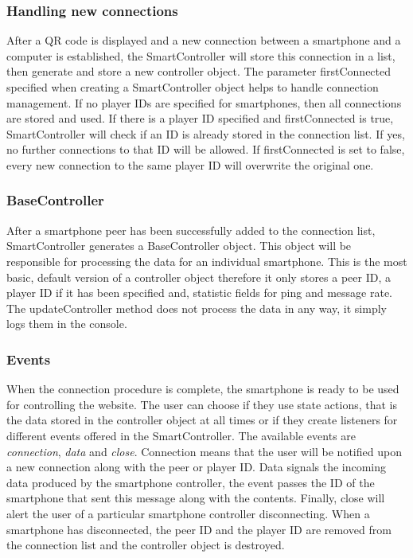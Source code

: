 \documentclass{l4proj}
\begin{document}
\subsubsection{Handling new connections}
After a QR code is displayed and a new connection between a smartphone and a computer is established, the SmartController will store this connection in a list, then generate and store a new controller object. The parameter firstConnected specified when creating a SmartController object helps to handle connection management. If no player IDs are specified for smartphones, then all connections are stored and used. If there is a player ID specified and firstConnected is true, SmartController will check if an ID is already stored in the connection list. If yes, no further connections to that ID will be allowed. If firstConnected is set to false, every new connection to the same player ID will overwrite the original one. \par

\subsubsection{BaseController} 
After a smartphone peer has been successfully added to the connection list, SmartController generates a BaseController object. This object will be responsible for processing the data for an individual smartphone. This is the most basic, default version of a controller object therefore it only stores a peer ID, a player ID if it has been specified and, statistic fields for ping and message rate. The updateController method does not process the data in any way, it simply logs them in the console. 

\subsubsection{Events} 
When the connection procedure is complete, the smartphone is ready to be used for controlling the website. The user can choose if they use state actions, that is the data stored in the controller object at all times or if they create listeners for different events offered in the SmartController. The available events are \emph{connection}, \emph{data} and \emph{close}. Connection means that the user will be notified upon a new connection along with the peer or player ID. Data signals the incoming data produced by the smartphone controller, the event passes the ID of the smartphone that sent this message along with the contents. Finally, close will alert the user of a particular smartphone controller disconnecting. When a smartphone has disconnected, the peer ID and the player ID are removed from the connection list and the controller object is destroyed.  \par 
\end{document}
